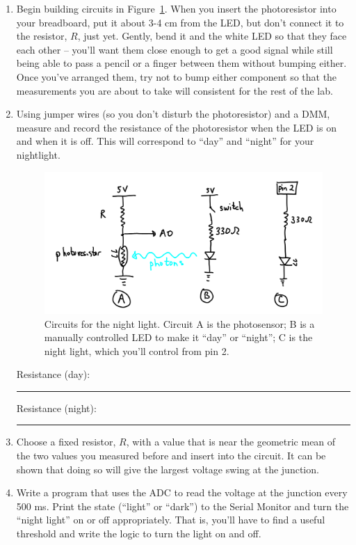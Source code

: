 \documentclass[11pt]{article} %
\begin{document}
\begin{enumerate}
\item Begin building circuits in Figure~\ref{fig:night.light}. When you insert the photoresistor into your breadboard, put it about 3-4 cm from the LED, but don’t connect it to the resistor, $R$, just yet. Gently, bend it and the white LED so that they face each other -- you’ll want them close enough to get a good signal while still being able to pass a pencil or a finger between them without bumping either. Once you’ve arranged them, try not to bump either component so that the measurements you are about to take will consistent for the rest of the lab.
\item Using jumper wires (so you don’t disturb the photoresistor) and a DMM, measure and record the resistance of the photoresistor when the LED is on and when it is off. This will correspond to “day” and “night” for your nightlight.

\begin{figure}[htbp]
\begin{center}
\includegraphics[width=\textwidth]{figures/night_light}
\caption{Circuits for the night light. Circuit A is the photosensor; B is a manually controlled LED to make it “day” or “night”; C is the night light, which you’ll control from pin 2.}
\label{fig:night.light}
\end{center}
\end{figure}

\vspace{0.25in}
Resistance (day): \rule{2in}{0.4pt}

\vspace{0.25in}
Resistance (night): \rule{2in}{0.4pt}
\vspace{0.25in}

\item Choose a fixed resistor, $R$, with a value that is near the geometric mean of the two values you measured before and insert into the circuit. It can be shown that doing so will give the largest voltage swing at the junction.
\item Write a program that uses the ADC to read the voltage at the junction every 500 ms. Print the state (“light” or “dark”) to the Serial Monitor and turn the “night light” on or off appropriately. That is, you’ll have to find a useful threshold and write the logic to turn the light on and off.
\end{enumerate}
\end{document}
